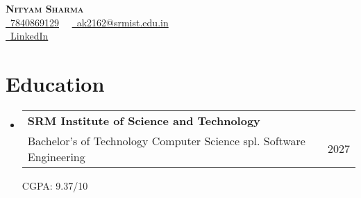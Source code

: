 \documentclass{article}
\makeatletter
\newcommand{\resumeSubHeading}[4]{
    \vspace{6pt}
    \item \begin{tabular*}{0.97\textwidth}[t]{l@{\extracolsep{\fill}}r}
        \textbf{#1} & #2 \\[1pt]
        {\small {#3}} & {\small #4} \\
    \end{tabular*}
    \vspace{-3pt}
}
\newcommand{\resumeSubHeadingListStart}{\begin{itemize}[leftmargin=0.15in, label={}]}
\newcommand{\resumeSubHeadingListEnd}{\end{itemize}}
\makeatother
\begin{document}
\textbf{\LARGE \scshape Nityam Sharma} \\[-6mm] \hfill
\small \href{tel:7840869129}{\faPhone\  7840869129} \ \
\href{mailto:ak2162@srmist.edu.in}{\faEnvelope\ ak2162@srmist.edu.in} \\[1mm]
\hfill
\href{https://www.linkedin.com/in/adikul358/}{\faLinkedin \  LinkedIn}

\section{Education}
\vspace{-6pt}
\resumeSubHeadingListStart
\resumeSubHeading
{SRM Institute of Science and Technology}{}
{Bachelor's of Technology Computer Science spl. Software Engineering}{2027}{CGPA: 9.37/10}
\resumeSubHeadingListEnd

\vspace{6pt}
\end{document}
